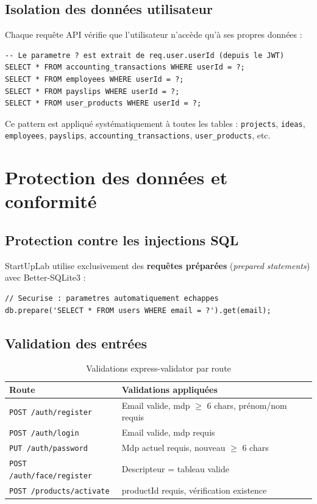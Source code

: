 \subsection{Isolation des données utilisateur}

Chaque requête API vérifie que l'utilisateur n'accède qu'à ses propres données :

\begin{verbatim}
-- Le parametre ? est extrait de req.user.userId (depuis le JWT)
SELECT * FROM accounting_transactions WHERE userId = ?;
SELECT * FROM employees WHERE userId = ?;
SELECT * FROM payslips WHERE userId = ?;
SELECT * FROM user_products WHERE userId = ?;
\end{verbatim}

Ce pattern est appliqué systématiquement à toutes les tables : \texttt{projects}, \texttt{ideas}, \texttt{employees}, \texttt{payslips}, \texttt{accounting\_transactions}, \texttt{user\_products}, etc.

\section{Protection des données et conformité}

\subsection{Protection contre les injections SQL}

StartUpLab utilise exclusivement des \textbf{requêtes préparées} (\textit{prepared statements}) avec Better-SQLite3 :

\begin{verbatim}
// Securise : parametres automatiquement echappes
db.prepare('SELECT * FROM users WHERE email = ?').get(email);
\end{verbatim}

\subsection{Validation des entrées}

\begin{table}[H]
\centering
\caption{Validations express-validator par route}
\label{tab:validations}
\begin{tabular}{|l|l|}
\hline
\textbf{Route} & \textbf{Validations appliquées} \\
\hline
\texttt{POST /auth/register} & Email valide, mdp $\geq$ 6 chars, prénom/nom requis \\
\hline
\texttt{POST /auth/login} & Email valide, mdp requis \\
\hline
\texttt{PUT /auth/password} & Mdp actuel requis, nouveau $\geq$ 6 chars \\
\hline
\texttt{POST /auth/face/register} & Descripteur = tableau valide \\
\hline
\texttt{POST /products/activate} & productId requis, vérification existence \\
\hline
\end{tabular}
\end{table}

